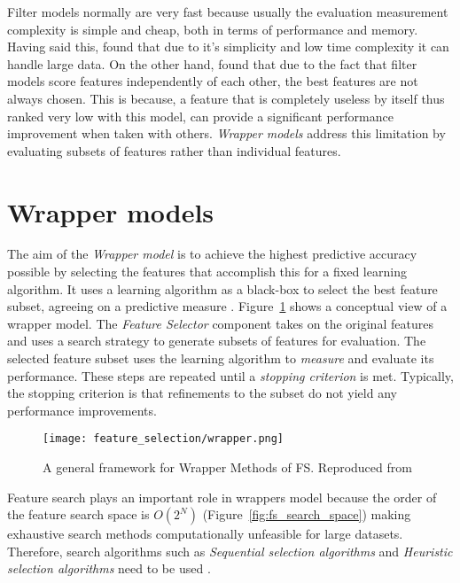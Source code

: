 Filter models normally are very fast because usually the evaluation measurement complexity is simple and cheap, both in terms of performance and memory. Having said this, \citet{garcia2015data} found that due to it's simplicity and low time complexity it can handle large data. On the other hand, \citet{guyon2003introduction} found that due to the fact that filter models score features independently of each other, the best features are not always chosen. This is because, a feature that is completely useless by itself thus ranked very low with this model, can provide a significant performance improvement when taken with others. \textit{Wrapper models} address this limitation by evaluating subsets of features rather than individual features.

\section{Wrapper models}\label{sec:fs_filter}
The aim of the \textit{Wrapper model} is to achieve the highest predictive accuracy possible by selecting the features that accomplish this for a fixed learning algorithm. It uses a learning algorithm as a black-box to select the best feature subset, agreeing on a predictive measure \citep{kohavi1995study}. Figure~\ref{fig:fs_wrapper} shows a conceptual view of a wrapper model. The \textit{Feature Selector} component takes on the original features and uses a search strategy to generate subsets of features for evaluation. The selected feature subset uses the learning algorithm to \textit{measure} and evaluate its performance. These steps are repeated until a \textit{stopping criterion} is met. Typically, the stopping criterion is that refinements to the subset do not yield any performance improvements.

\begin{figure}
  \texttt{[image: feature\_selection/wrapper.png]}
  \caption{A general framework for Wrapper Methods of FS. Reproduced from \citet{tang2014feature}}
  \label{fig:fs_wrapper}
\end{figure}

Feature search plays an important role in wrappers model because the order of the feature search space is $O(2^N)$ (Figure~\ref{fig:fs_search_space}) making exhaustive search methods computationally unfeasible for large datasets. Therefore, search algorithms such as \textit{Sequential selection algorithms} and \textit{Heuristic selection algorithms} need to be used \citep{chandrashekar2014survey}.

